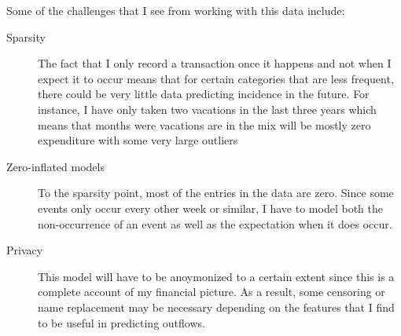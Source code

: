 \documentclass[11pt,a4paper]{article}
\begin{document}
Some of the challenges that I see from working with this data include:
\begin{description}
	\item[Sparsity] The fact that I only record a transaction once it happens and not when I expect it to occur means that for certain categories that are less frequent, there could be very little data predicting incidence in the future. For instance, I have only taken two vacations in the last three years which means that months were vacations are in the mix will be mostly zero expenditure with some very large outliers
	\item[Zero-inflated models] To the sparsity point, most of the entries in the data are zero. Since some events only occur every other week or similar, I have to model both the non-occurrence of an event as well as the expectation when it does occur.
	\item[Privacy] This model will have to be anoymonized to a certain extent since this is a complete account of my financial picture. As a result, some censoring or name replacement may be necessary depending on the features that I find to be useful in predicting outflows.
\end{description}
\end{document}
